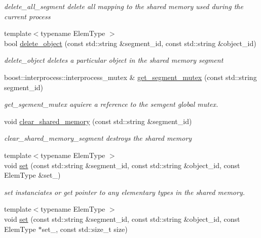\begin{DoxyCompactItemize}
\begin{DoxyCompactList}\small\item\em delete\+\_\+all\+\_\+segment delete all mapping to the shared memory used during the current process \end{DoxyCompactList}\item 
{\footnotesize template$<$typename Elem\+Type $>$ }\\bool \hyperlink{namespaceshared__memory_a7b43b29fa0aa6a5cad0ca47afdd03e83}{delete\+\_\+object} (const std\+::string \&segment\+\_\+id, const std\+::string \&object\+\_\+id)
\begin{DoxyCompactList}\small\item\em delete\+\_\+object deletes a particular object in the shared memory segment \end{DoxyCompactList}\item 
boost\+::interprocess\+::interprocess\+\_\+mutex \& \hyperlink{namespaceshared__memory_aed33c9701140a1c43e40f182a380199b}{get\+\_\+segment\+\_\+mutex} (const std\+::string segment\+\_\+id)
\begin{DoxyCompactList}\small\item\em get\+\_\+sgement\+\_\+mutex aquiere a reference to the semgent global mutex. \end{DoxyCompactList}\item 
void \hyperlink{namespaceshared__memory_aa8583540879db53fc80b31410b5eec68}{clear\+\_\+shared\+\_\+memory} (const std\+::string \&segment\+\_\+id)
\begin{DoxyCompactList}\small\item\em clear\+\_\+shared\+\_\+memory\+\_\+segment destroys the shared memory \end{DoxyCompactList}\item 
{\footnotesize template$<$typename Elem\+Type $>$ }\\void \hyperlink{namespaceshared__memory_ace68bf582cfe50ba83a9cfc9b7aed3b2}{set} (const std\+::string \&segment\+\_\+id, const std\+::string \&object\+\_\+id, const Elem\+Type \&set\+\_\+)
\begin{DoxyCompactList}\small\item\em set instanciates or get pointer to any elementary types in the shared memory. \end{DoxyCompactList}\item 
{\footnotesize template$<$typename Elem\+Type $>$ }\\void \hyperlink{namespaceshared__memory_a7e37a0a2146d2cfeeccb63390a3d9132}{set} (const std\+::string \&segment\+\_\+id, const std\+::string \&object\+\_\+id, const Elem\+Type $\ast$set\+\_\+, const std\+::size\+\_\+t size)

\end{DoxyCompactItemize}
